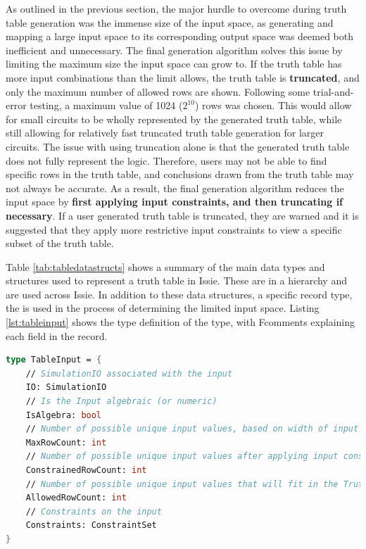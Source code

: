 As outlined in the previous section, the major hurdle to overcome during truth table generation was the immense size of the input space, as generating and mapping a large input space to its corresponding output space was deemed both inefficient and unnecessary. The final generation algorithm solves this issue by limiting the maximum size the input space can grow to. If the truth table has more input combinations than the limit allows, the truth table is \textbf{truncated}, and only the maximum number of allowed rows are shown. Following some trial-and-error testing, a maximum value of 1024 ($2^10$) rows was chosen. This would allow for small circuits to be wholly represented by the generated truth table, while still allowing for relatively fast truncated truth table generation for larger circuits. The issue with using truncation alone is that the generated truth table does not fully represent the logic. Therefore, users may not be able to find specific rows in the truth table, and conclusions drawn from the truth table may not always be accurate. As a result, the final generation algorithm reduces the input space by \textbf{first applying input constraints, and then truncating if necessary}. If a user generated truth table is truncated, they are warned and it is suggested that they apply more restrictive input constraints to view a specific subset of the truth table.

Table \ref{tab:tabledatastructs} shows a summary of the main data types and structures used to represent a truth table in Issie. These are in a hierarchy and are used across Issie. In addition to these data structures, a specific record type, the  is used in the process of determining the limited input space. Listing \ref{lst:tableinput} shows the type definition of the  type, with F\fsharp comments explaining each field in the record.

\begin{lstlisting}[caption=Definition of TableInput type, frame=tb, language=FSharp, label=lst:tableinput]
type TableInput = {
    // SimulationIO associated with the input
    IO: SimulationIO
    // Is the Input algebraic (or numeric)
    IsAlgebra: bool
    // Number of possible unique input values, based on width of input
    MaxRowCount: int
    // Number of possible unique input values after applying input constraints
    ConstrainedRowCount: int
    // Number of possible unique input values that will fit in the Truth Table after truncation
    AllowedRowCount: int
    // Constraints on the input
    Constraints: ConstraintSet
}
\end{lstlisting}

